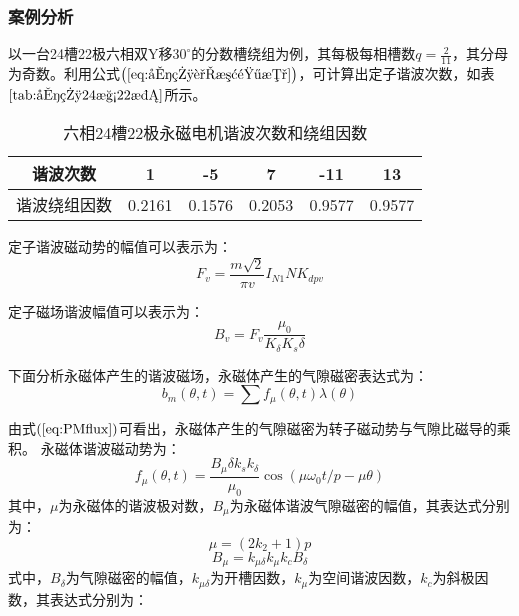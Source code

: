 \documentclass[11pt,a4paper]{article}
\begin{document}
\subsubsection{案例分析}
以一台24槽22极六相双Y移$30^\circ$的分数槽绕组为例，其每极每相槽数$ q=\frac{2}{11} $，其分母为奇数。利用公式$ \left( \ref{eq:六相谐波阶数} \right) $，可计算出定子谐波次数，如表$ \ref{tab:六相24槽22极} $所示。
\begin{table}[h]
	\centering
	\caption{六相24槽22极永磁电机谐波次数和绕组因数}
	\label{tab:六相24槽22极}
	\begin{tabular}{cccccc}
		\hline
		谐波次数 & 1 & -5 & 7 & -11 & 13 \\
		\hline
		谐波绕组因数 & 0.2161 & 0.1576 & 0.2053 & 0.9577 & 0.9577 \\
		\hline
	\end{tabular}
\end{table} \par
定子谐波磁动势的幅值可以表示为：
\begin{equation}F_{v}=\frac{m \sqrt{2}}{\pi v} I_{N 1} N K_{d p v}\end{equation} \par
定子磁场谐波幅值可以表示为：
\begin{equation}B_{v}=F_{v} \frac{\mu_{0}}{K_{\delta} K_{s} \delta}\end{equation} \par
下面分析永磁体产生的谐波磁场，永磁体产生的气隙磁密表达式为：
\begin{equation} \label{eq:PMflux} b_{m}(\theta, t)=\sum f_{\mu}(\theta, t) \lambda(\theta)\end{equation}\par
由式$ \left( \ref{eq:PMflux}\right)  $可看出，永磁体产生的气隙磁密为转子磁动势与气隙比磁导的乘积。
永磁体谐波磁动势为：
\begin{equation} \label{eq:PM_MMF} f_{\mu}(\theta, t)=\frac{B_{\mu} \delta k_{s} k_{\delta}}{\mu_{0}} \cos \left(\mu \omega_{0} t / p-\mu \theta\right)\end{equation}
其中，$ \mu $为永磁体的谐波极对数，$ B_{\mu} $为永磁体谐波气隙磁密的幅值，其表达式分别为：
\begin{equation}\mu=\left(2 k_{2}+1\right) p\end{equation}
\begin{equation}B_{\mu}=k_{\mu \delta} k_{\mu} k_{c} B_{\delta}\end{equation}
式中，$ B_{\delta} $为气隙磁密的幅值，$ k_{\mu\delta} $为开槽因数，$ k_{\mu} $为空间谐波因数，$ k_{c} $为斜极因数，其表达式分别为：
\end{document}
